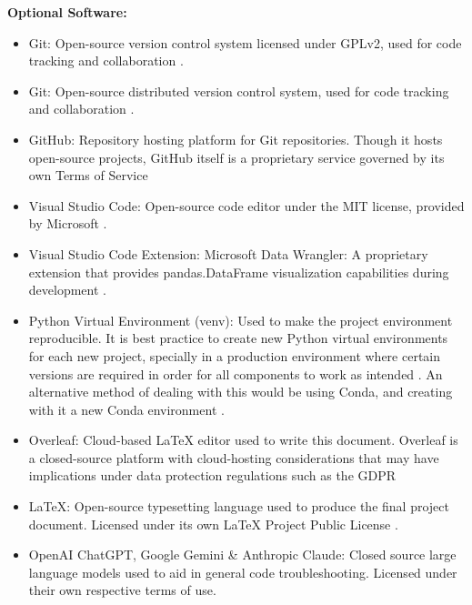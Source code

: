 \documentclass[12pt]{report} %
\begin{document}
\noindent \textbf{Optional Software:}
\begin{itemize}
    \item Git: Open-source version control system licensed under GPLv2, used for code tracking and collaboration \cite{git}.

    \item Git: Open-source distributed version control system, used for code tracking and collaboration \cite{git}.
    
    \item GitHub: Repository hosting platform for Git repositories. Though it hosts open-source projects, GitHub itself is a proprietary service governed by its own Terms of Service \cite{github}
    
    \item Visual Studio Code: Open-source code editor under the MIT license, provided by Microsoft \cite{vscode}.
    
    \item Visual Studio Code Extension: Microsoft Data Wrangler: A proprietary extension that provides pandas.DataFrame visualization capabilities during development \cite{VSCode_DataWrangler}.

    \item Python Virtual Environment (venv): Used to make the project environment reproducible. It is best practice to create new Python virtual environments for each new project, specially in a production environment where certain versions are required in order for all components to work as intended \cite{python_venv}. An alternative method of dealing with this would be using Conda, and creating with it a new Conda environment \cite{conda}.

    \item Overleaf: Cloud-based LaTeX editor used to write this document. Overleaf is a closed-source platform with cloud-hosting considerations that may have implications under data protection regulations such as the GDPR \cite{overleaf}
    
    \item LaTeX: Open-source typesetting language used to produce the final project document. Licensed under its own LaTeX Project Public License \cite{latex}.

    \item OpenAI ChatGPT, Google Gemini \& Anthropic Claude: Closed source large language models used to aid in general code troubleshooting. Licensed under their own respective terms of use. 
\end{itemize}
\end{document}
